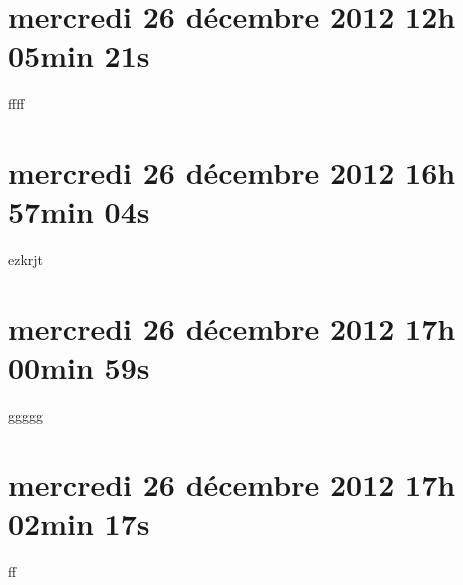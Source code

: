 
\section{mercredi 26 décembre 2012 12h 05min 21s}

ffff

\section{mercredi 26 décembre 2012 16h 57min 04s}

ezkrjt

\section{mercredi 26 décembre 2012 17h 00min 59s}

ggggg

\section{mercredi 26 décembre 2012 17h 02min 17s}

ff
